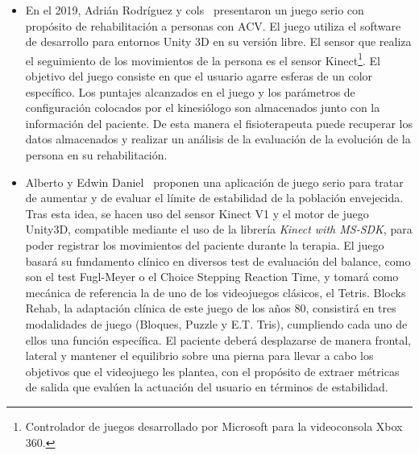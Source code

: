 \begin{itemize}
    \item En el 2019, Adrián Rodríguez y cols~\cite{rodriguez2019design} presentaron un juego serio con propósito de rehabilitación a personas con ACV. El juego utiliza el software de desarrollo para entornos Unity 3D en su versión libre. El sensor que realiza el seguimiento de los movimientos de la persona es el sensor Kinect\footnote{Controlador de juegos desarrollado por Microsoft para la videoconsola Xbox 360.}. El objetivo del juego consiste en que el usuario agarre esferas de un color específico. Los puntajes alcanzados en el juego y los parámetros de configuración colocados por el kinesiólogo son almacenados junto con la información del paciente. De esta manera el fisioterapeuta puede recuperar los datos almacenados y realizar un análisis de la evaluación de la evolución de la persona en su rehabilitación. 
    
    \item Alberto y Edwin Daniel~\cite{morales2019desarrollo} proponen una aplicación de juego serio para tratar de aumentar y de evaluar el límite de estabilidad de la población envejecida. Tras esta idea, se hacen uso del sensor Kinect V1 y el motor de juego Unity3D, compatible mediante el uso de la librería \textit{Kinect with MS-SDK}, para poder registrar los movimientos del paciente durante la terapia. El juego basará su fundamento clínico en diversos test de evaluación del balance, como son el test Fugl-Meyer o el Choice Stepping Reaction Time, y tomará como mecánica de referencia la de uno de los videojuegos clásicos, el Tetris. Blocks Rehab, la adaptación clínica de este juego de los años 80, consistirá en tres modalidades de juego (Bloques, Puzzle y E.T. Tris), cumpliendo cada uno de ellos una función específica. El paciente deberá desplazarse de manera frontal, lateral y mantener el equilibrio sobre una pierna para llevar a cabo los objetivos que el videojuego les plantea, con el propósito de extraer métricas de salida que evalúen la actuación del usuario en términos de estabilidad. 
    

\end{itemize}
